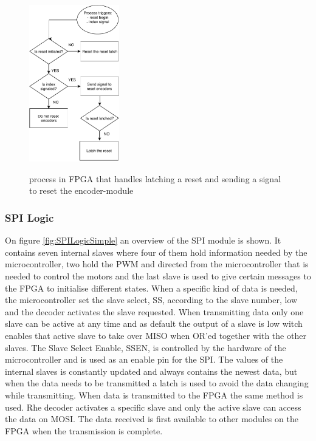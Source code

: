 \documentclass[../../main.tex]{subfiles}
\begin{document}


\begin{figure}
\centering
    \caption{process in FPGA that handles latching a reset and sending a signal to reset the encoder-module}
    \includegraphics[width=0.35\textwidth]{Sections/System_Implementation/Images/FPGAFlowchartsResetLatchAndIndex.pdf}
    \label{fig:FPGAFlowchartsResetLatchAndIndex}
\end{figure}

\subsubsection*{SPI Logic}




On figure \ref{fig:SPILogicSimple} an overview of the SPI module is shown. It contains seven internal slaves where four of them hold information needed by the microcontroller, two hold the PWM and directed from the microcontroller that is needed to control the motors and the last slave is used to give certain messages to the FPGA to initialise different states. When a specific kind of data is needed, the microcontroller set the slave select, SS, according to the slave number, low and the decoder activates the slave requested. When transmitting data only one slave can be active at any time and as default the output of a slave is low witch enables that active slave to take over MISO when OR'ed together with the other slaves. The Slave Select Enable, SSEN, is controlled by the hardware of the microcontroller and is used as an enable pin for the SPI. The values of the internal slaves is constantly updated and always contains the newest data, but when the data needs to be transmitted a latch is used to avoid the data changing while transmitting. 
When data is transmitted to the FPGA the same method is used. Rhe decoder activates a specific slave and only the active slave can access the data on MOSI. The data received is first available to other modules on the FPGA when the transmission is complete. 
\end{document}
